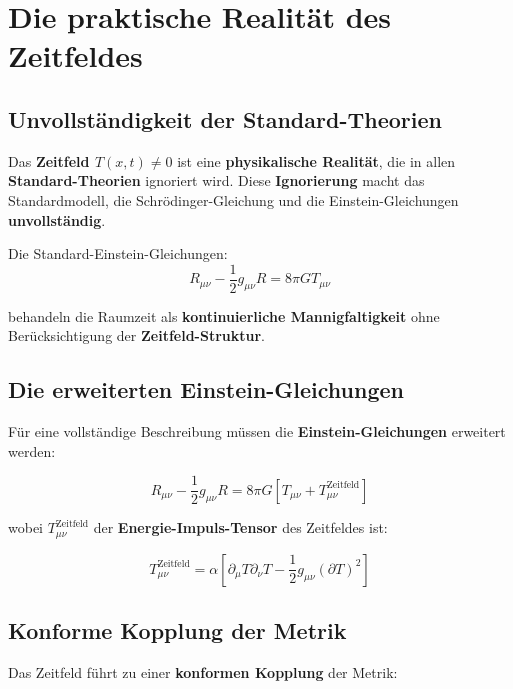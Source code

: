 \documentclass[12pt,a4paper]{report}
\begin{document}
	
	\section{Die praktische Realität des Zeitfeldes}
	
	\subsection{Unvollständigkeit der Standard-Theorien}
	
	Das \textbf{Zeitfeld $T(x,t) \neq 0$} ist eine \textbf{physikalische Realität}, die in allen \textbf{Standard-Theorien} ignoriert wird. Diese \textbf{Ignorierung} macht das Standardmodell, die Schrödinger-Gleichung und die Einstein-Gleichungen \textbf{unvollständig}.
	
	Die Standard-Einstein-Gleichungen:
	\begin{equation}
		R_{\mu\nu} - \frac{1}{2}g_{\mu\nu}R = 8\pi G T_{\mu\nu}
	\end{equation}
	
	behandeln die Raumzeit als \textbf{kontinuierliche Mannigfaltigkeit} ohne Berücksichtigung der \textbf{Zeitfeld-Struktur}.
	
	\subsection{Die erweiterten Einstein-Gleichungen}
	
	Für eine vollständige Beschreibung müssen die \textbf{Einstein-Gleichungen} erweitert werden:
	
	\begin{equation}
		R_{\mu\nu} - \frac{1}{2}g_{\mu\nu}R = 8\pi G[T_{\mu\nu} + T_{\mu\nu}^{\text{Zeitfeld}}]
	\end{equation}
	
	wobei $T_{\mu\nu}^{\text{Zeitfeld}}$ der \textbf{Energie-Impuls-Tensor} des Zeitfeldes ist:
	
	\begin{equation}
		T_{\mu\nu}^{\text{Zeitfeld}} = \alpha[\partial_\mu T \partial_\nu T - \frac{1}{2}g_{\mu\nu}(\partial T)^2]
	\end{equation}
	
	\subsection{Konforme Kopplung der Metrik}
	
	Das Zeitfeld führt zu einer \textbf{konformen Kopplung} der Metrik:
	
\end{document}
